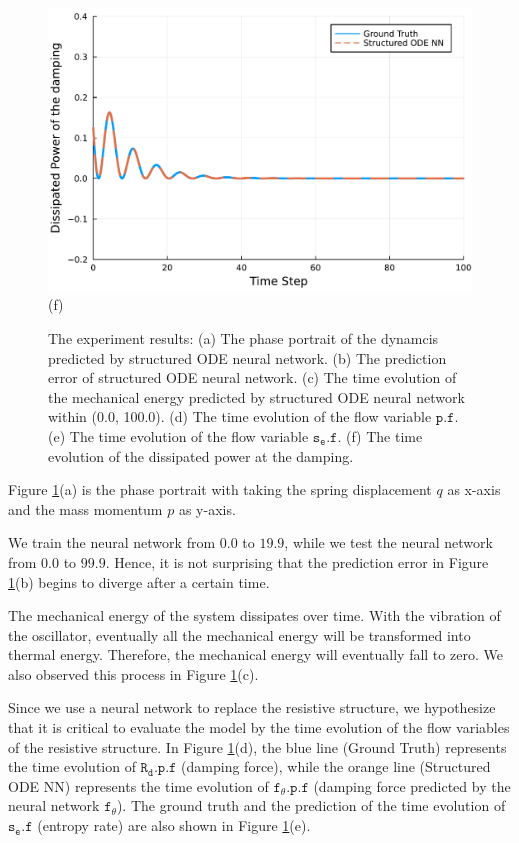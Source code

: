 \documentclass[
	parskip, 			   %
	twoside, 			   %
	DIV=14, 			   %
	BCOR=15.0mm, 		   %
	headsepline, 		   %
	open=right, 		   %
	captions=tableheading, %
	bibliography=totoc,    %
	numbers=noenddot       %
]{scrreprt}
\begin{document}
\begin{figure}[h!]
\begin{minipage}{.3\textwidth}
    \includegraphics[width=1\linewidth]{figures/dissipated_power_damping_idho.pdf}
    \\(f)
    \end{minipage}
    \caption{The experiment results: (a) The phase portrait of the dynamcis predicted by structured ODE neural network. (b) The prediction error of structured ODE neural network. (c) The time evolution of the mechanical energy predicted by structured ODE neural network within (0.0, 100.0). (d) The time evolution of the flow variable $\mathtt{p.f}$. (e) The time evolution of the flow variable $\mathtt{s_{e}.f}$. (f) The time evolution of the dissipated power at the damping.}
    \label{fig:idho_experiment}
\end{figure}

Figure \ref{fig:idho_experiment}(a) is the phase portrait with taking the spring displacement $q$ as x-axis and the mass momentum $p$ as y-axis.

We train the neural network from $0.0$ to $19.9$, while we test the neural network from $0.0$ to $99.9$. Hence, it is not surprising that the prediction error in Figure \ref{fig:idho_experiment}(b) begins to diverge after a certain time.

The mechanical energy of the system dissipates over time. With the vibration of the oscillator, eventually all the mechanical energy will be transformed into thermal energy. Therefore, the mechanical energy will eventually fall to zero. We also observed this process in Figure \ref{fig:idho_experiment}(c).

Since we use a neural network to replace the resistive structure, we hypothesize that it is critical to evaluate the model by the time evolution of the flow variables of the resistive structure. In Figure \ref{fig:idho_experiment}(d), the blue line (Ground Truth) represents the time evolution of $\mathtt{R_{d}.p.f}$ (damping force), while the orange line (Structured ODE NN) represents the time evolution of $\mathtt{f_{\theta}.p.f}$ (damping force predicted by the neural network $\mathtt{f_{\theta}}$). The ground truth and the prediction of the time evolution of $\mathtt{s_e.f}$ (entropy rate) are also shown in Figure \ref{fig:idho_experiment}(e).
\end{document}
